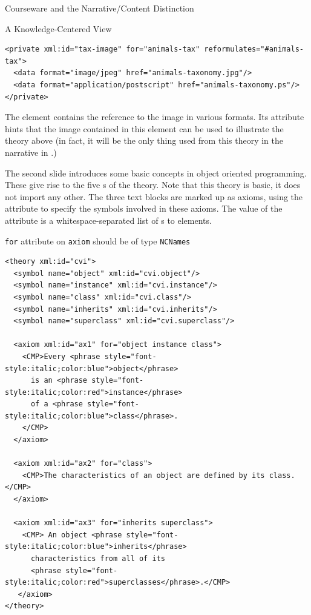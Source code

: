 \begin{tchapter}[id=courseware]{Courseware and the Narrative/Content Distinction}
\begin{tsection}[id=knowledge-centered]{A Knowledge-Centered View}
\begin{lstlisting}[label=lst:ann-tax,mathescape,
    caption={The {\omdoc} Representation for Slide 1 from {\myfigref{15-211}}},
    index={theory,axiom,symbol,CMP,FMP,OMA,OMOBJ,OMS,private,data}]
<private xml:id="tax-image" for="animals-tax" reformulates="#animals-tax">
  <data format="image/jpeg" href="animals-taxonomy.jpg"/>
  <data format="application/postscript" href="animals-taxonomy.ps"/>
</private>
\end{lstlisting}
The {} element contains the reference to the image in various
formats. Its {} attribute hints that the image
contained in this element can be used to illustrate the theory above (in fact, it
will be the only thing used from this theory in the narrative {\omdoc} in
{}.)

The second slide introduces some basic concepts in object oriented programming.  These
give rise to the five {s} of the theory. Note that this theory
is basic, it does not import any other. The three text blocks are marked up as axioms,
using the attribute {} to specify the symbols involved in these
axioms. The value of the {} attribute is a whitespace-separated list
of {s} to {} elements.

\begin{erratum}[reported-by=Michael Kohlhase,date=2009-08-11]{{\texttt{for}} attribute on
    {\texttt{axiom}} should be of type {\texttt{NCNames}}}
\begin{lstlisting}[label=lst:ann-oo,
    caption={The {\omdoc} Representation for Slide 2 from {\myfigref{15-211}}},
    index={theory,axiom,symbol,CMP,FMP,OMA,OMOBJ,OMS}]
<theory xml:id="cvi">
  <symbol name="object" xml:id="cvi.object"/>
  <symbol name="instance" xml:id="cvi.instance"/>
  <symbol name="class" xml:id="cvi.class"/>
  <symbol name="inherits" xml:id="cvi.inherits"/>
  <symbol name="superclass" xml:id="cvi.superclass"/>

  <axiom xml:id="ax1" for="object instance class">
    <CMP>Every <phrase style="font-style:italic;color:blue">object</phrase>
      is an <phrase style="font-style:italic;color:red">instance</phrase> 
      of a <phrase style="font-style:italic;color:blue">class</phrase>.
    </CMP>
  </axiom>

  <axiom xml:id="ax2" for="class">
    <CMP>The characteristics of an object are defined by its class.</CMP>
  </axiom>

  <axiom xml:id="ax3" for="inherits superclass">
    <CMP> An object <phrase style="font-style:italic;color:blue">inherits</phrase>
      characteristics from all of its 
      <phrase style="font-style:italic;color:red">superclasses</phrase>.</CMP>
   </axiom>
</theory>
\end{lstlisting}
\end{erratum}


\end{tsection}
\end{tchapter}
